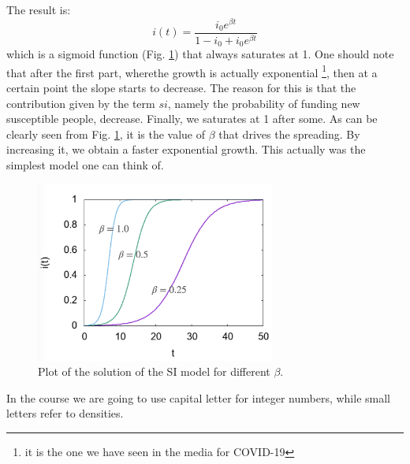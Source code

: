 \documentclass[../main/main.tex]{subfiles}
\begin{document}
The result is:
\begin{equation}
  i(t) = \frac{i_0 e^{\beta t} }{1-i_0 + i_0 e^{\beta t} }
\end{equation}
which is a sigmoid function (Fig. \ref{fig:3_2}) that always saturates at 1. One should note that after the first part, wherethe growth is actually exponential \footnote{it is the one we have seen in the media for COVID-19}, then at a certain point the slope starts to decrease. The reason for this is that the contribution given by the term $s i$, namely the probability of funding new susceptible people, decrease. Finally, we saturates at 1 after some. As can be clearly seen from Fig. \ref{fig:3_2}, it is the value of $\beta$ that drives the spreading. By increasing it, we obtain a faster exponential growth.
This actually was the simplest model one can think of.

\begin{figure}[h!]
\centering
\includegraphics[width=0.7\textwidth]{../lessons/image/03/2.png}
\caption{\label{fig:3_2} Plot of the solution of the SI model for different \( \beta  \).}
\end{figure}

\begin{remark}
In the course we are going to use capital letter for integer numbers, while small letters refer to densities.
\end{remark}
\end{document}
